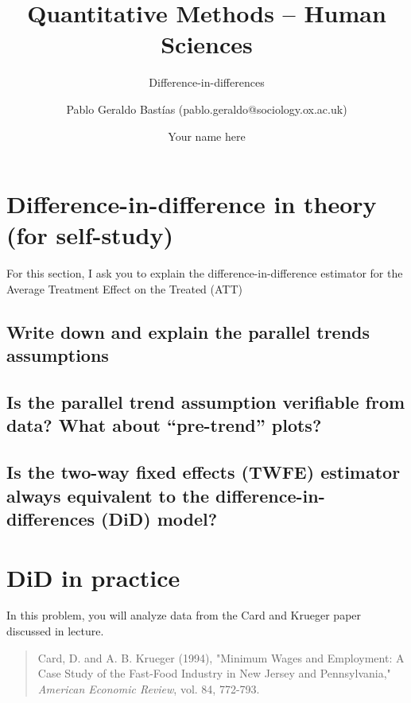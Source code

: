 \documentclass[
  12pt,
  letterpaper,
  DIV=11,
  numbers=noendperiod]{scrartcl}
\title{Quantitative Methods -- Human Sciences}
\subtitle{Difference-in-differences}
\author{Pablo Geraldo Bastías
(pablo.geraldo@sociology.ox.ac.uk) \and Your name here}
\date{}
\newcommand{\1}[1]{\mathds{1}\left[#1\right]}
\begin{document}
\maketitle


\newcommand{\benum}{\begin{enumerate}}
\newcommand{\eenum}{\end{enumerate}}
\newcommand{\bitem}{\begin{itemize}}
\newcommand{\eitem}{\end{itemize}}

\section{Difference-in-difference in theory (for
self-study)}\label{difference-in-difference-in-theory-for-self-study}

For this section, I ask you to explain the difference-in-difference
estimator for the Average Treatment Effect on the Treated (ATT)

\subsection{Write down and explain the parallel trends
assumptions}\label{write-down-and-explain-the-parallel-trends-assumptions}

\subsection{Is the parallel trend assumption verifiable from data? What
about ``pre-trend''
plots?}\label{is-the-parallel-trend-assumption-verifiable-from-data-what-about-pre-trend-plots}

\subsection{Is the two-way fixed effects (TWFE) estimator always
equivalent to the difference-in-differences (DiD)
model?}\label{is-the-two-way-fixed-effects-twfe-estimator-always-equivalent-to-the-difference-in-differences-did-model}

\section{DiD in practice}\label{did-in-practice}

In this problem, you will analyze data from the Card and Krueger paper
discussed in lecture.

\begin{quote}
Card, D. and A. B. Krueger (1994), "Minimum Wages and
Employment: A Case Study of the Fast-Food Industry in New Jersey and
Pennsylvania," \textit{American Economic Review}, vol. 84, 772-793.
\end{quote}
\end{document}
